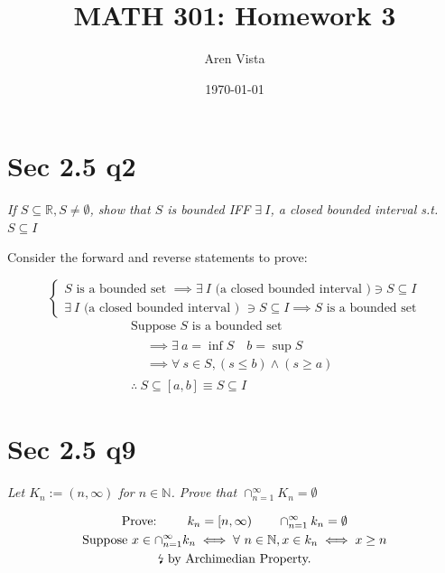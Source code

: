 \documentclass[11pt]{article}
\title{ MATH 301: Homework 3}
\author{ Aren Vista }
\date{\today}
\newcommand{\question}[1]{
    \begin{mdframed}[
        linecolor=gray,       %
        linewidth=0.5pt,      %
        innertopmargin=10pt,  %
        innerbottommargin=10pt %
    ]
    \centering \itshape #1
    \end{mdframed}
}
\theoremstyle{plain}
\begin{document}
 \maketitle \pagebreak
\section*{Sec 2.5 q2}
\question{ If $S \subseteq \mathbb{R}, S \neq \emptyset$, show that $S$ is bounded IFF $\exists ~I$, a closed bounded interval s.t. $S \subseteq I$ }

\begin{center} Consider the forward and reverse statements to prove: \end{center}
\[
	\left \{ \begin{array}{l}
		S \text{ is a bounded set } \implies \exists ~I \text{ (a closed bounded interval )} \ni S \subseteq I \\
		\exists ~I \text{ (a closed bounded interval ) } \ni S \subseteq I \implies S \text{ is a bounded set}
	\end{array} \right .
\]
\[
	\begin{gathered}
		\text{Suppose $S$ is a bounded set } \\
		\begin{aligned}
			 & \implies \exists ~a=\inf S \quad b=\sup S               \\
			 & \implies  \forall ~s \in S, (s \leq b) \land (s \geq a)
		\end{aligned} \\
		\therefore ~S \subseteq [a,b] \equiv S \subseteq I
	\end{gathered}
\]

\section*{Sec 2.5 q9}
\question{ Let $K_n := (n, \infty)$ for $n \in \mathbb{N}$. Prove that $\cap^{\infty}_{n=1}K_n = \emptyset$}
$$
	\begin{gathered}
		\text{Prove: }  \quad \quad k_n = [n,\infty) \quad \quad \cap^{\infty}_{n=1} k_n = \emptyset \\
	\text{Suppose } x \in  \cap^{\infty}_{n=1} k_n \iff  \forall~ n \in  \mathbb{N}, x \in  k_n \iff x \geq  n  \\
        \text{\lightning}  \text{ by Archimedian Property.}
	\end{gathered}
$$
\end{document}
